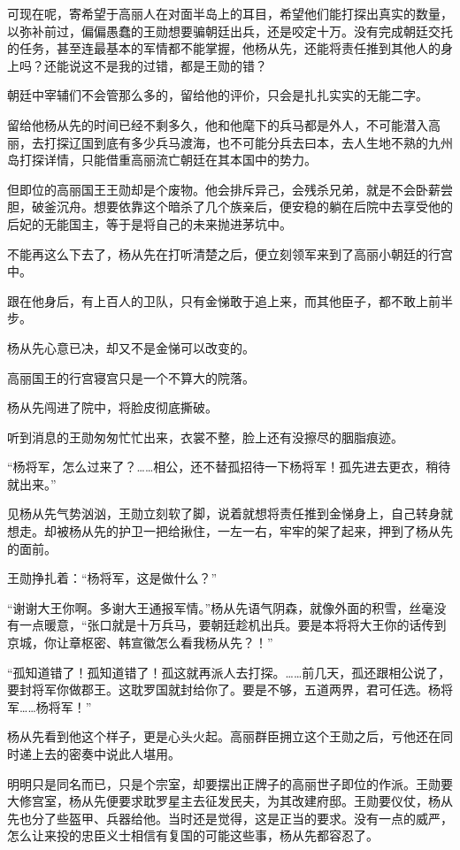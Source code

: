 可现在呢，寄希望于高丽人在对面半岛上的耳目，希望他们能打探出真实的数量，以弥补前过，偏偏愚蠢的王勋想要骗朝廷出兵，还是咬定十万。没有完成朝廷交托的任务，甚至连最基本的军情都不能掌握，他杨从先，还能将责任推到其他人的身上吗？还能说这不是我的过错，都是王勋的错？

朝廷中宰辅们不会管那么多的，留给他的评价，只会是扎扎实实的无能二字。

留给他杨从先的时间已经不剩多久，他和他麾下的兵马都是外人，不可能潜入高丽，去打探辽国到底有多少兵马渡海，也不可能分兵去曰本，去人生地不熟的九州岛打探详情，只能借重高丽流亡朝廷在其本国中的势力。

但即位的高丽国王王勋却是个废物。他会排斥异己，会残杀兄弟，就是不会卧薪尝胆，破釜沉舟。想要依靠这个暗杀了几个族亲后，便安稳的躺在后院中去享受他的后妃的无能国主，等于是将自己的未来抛进茅坑中。

不能再这么下去了，杨从先在打听清楚之后，便立刻领军来到了高丽小朝廷的行宫中。

跟在他身后，有上百人的卫队，只有金悌敢于追上来，而其他臣子，都不敢上前半步。

杨从先心意已决，却又不是金悌可以改变的。

高丽国王的行宫寝宫只是一个不算大的院落。

杨从先闯进了院中，将脸皮彻底撕破。

听到消息的王勋匆匆忙忙出来，衣裳不整，脸上还有没擦尽的胭脂痕迹。

“杨将军，怎么过来了？……相公，还不替孤招待一下杨将军！孤先进去更衣，稍待就出来。”

见杨从先气势汹汹，王勋立刻软了脚，说着就想将责任推到金悌身上，自己转身就想走。却被杨从先的护卫一把给揪住，一左一右，牢牢的架了起来，押到了杨从先的面前。

王勋挣扎着：“杨将军，这是做什么？”

“谢谢大王你啊。多谢大王通报军情。”杨从先语气阴森，就像外面的积雪，丝毫没有一点暖意，“张口就是十万兵马，要朝廷趁机出兵。要是本将将大王你的话传到京城，你让章枢密、韩宣徽怎么看我杨从先？！”

“孤知道错了！孤知道错了！孤这就再派人去打探。……前几天，孤还跟相公说了，要封将军你做郡王。这耽罗国就封给你了。要是不够，五道两界，君可任选。杨将军……杨将军！”

杨从先看到他这个样子，更是心头火起。高丽群臣拥立这个王勋之后，亏他还在同时递上去的密奏中说此人堪用。

明明只是同名而已，只是个宗室，却要摆出正牌子的高丽世子即位的作派。王勋要大修宫室，杨从先便要求耽罗星主去征发民夫，为其改建府邸。王勋要仪仗，杨从先也分了些盔甲、兵器给他。当时还是觉得，这是正当的要求。没有一点的威严，怎么让来投的忠臣义士相信有复国的可能这些事，杨从先都容忍了。

